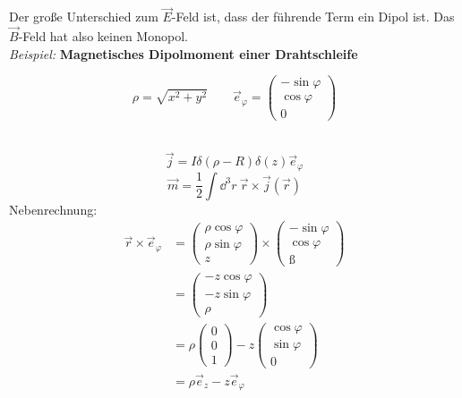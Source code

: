 \noindent
Der große Unterschied zum $ \vec{E} $-Feld ist, dass der führende Term ein Dipol ist. Das $ \vec{B} $-Feld hat also keinen Monopol.\\[5pt]
\emph{Beispiel:} \textbf{Magnetisches Dipolmoment einer Drahtschleife}\\
\begin{minipage}{.5\linewidth}
	$$ \rho = \sqrt{x^2 + y^2} \qquad \vec{e}_{\varphi} = \begin{pmatrix}
	- \sin \varphi \\ \cos \varphi \\ 0
	\end{pmatrix}$$
\end{minipage}%
\begin{minipage}{.5\linewidth}
	\centering
\end{minipage}%
\\
\begin{equation*}
\vec{j} = I \delta(\rho - R) \delta(z) \vec{e}_{\varphi}
\end{equation*}
\begin{equation*}
\vec{m} = \frac{1}{2} \int \dd^3 r \ \vec{r} \times \vec{j}(\vec{r})
\end{equation*}
Nebenrechnung:
\begin{align*}
\vec{r} \times \vec{e}_{\varphi} &= \begin{pmatrix}
\rho \cos \varphi \\ \rho \sin \varphi \\ z
\end{pmatrix} \times \begin{pmatrix}
- \sin \varphi \\ \cos \varphi \\ ß
\end{pmatrix}\\
&= \begin{pmatrix}
- z \cos \varphi \\ - z \sin \varphi \\ \rho
\end{pmatrix}\\
&= \rho \begin{pmatrix}
0 \\ 0 \\ 1
\end{pmatrix} - z \begin{pmatrix}
\cos \varphi \\ \sin \varphi \\ 0
\end{pmatrix}\\
&= \rho \vec{e}_z - z \vec{e}_{\varphi}
\end{align*}
